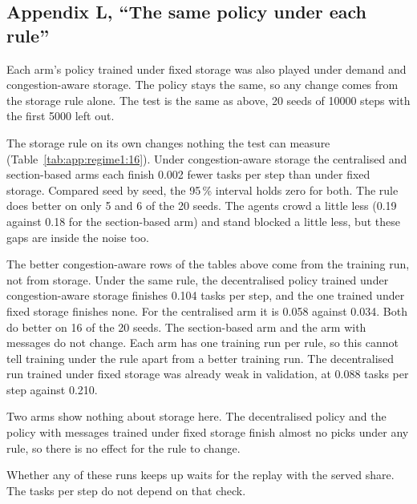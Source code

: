 \documentclass[11pt,a4paper]{article}
\newcommand{\new}[1]{\textcolor{newc}{#1}}
\begin{document}
\subsection*{\new{Appendix L, ``The same policy under each rule''}}

\new{Each arm's policy trained under fixed storage was also played under demand and congestion-aware
storage. The policy stays the same, so any change comes from the storage rule alone. The test is the
same as above, 20 seeds of 10000 steps with the first 5000 left out.}

\new{The storage rule on its own changes nothing the test can measure
(Table~\ref{tab:app:regime1:16}). Under congestion-aware storage the centralised and section-based
arms each finish 0.002 fewer tasks per step than under fixed storage. Compared seed by seed, the
95\,\% interval holds zero for both. The rule does better on only 5 and 6 of the 20 seeds. The agents
crowd a little less (0.19 against 0.18 for the section-based arm) and stand blocked a little less, but
these gaps are inside the noise too.}

\new{The better congestion-aware rows of the tables above come from the training run, not from
storage. Under the same rule, the decentralised policy trained under congestion-aware storage
finishes 0.104 tasks per step, and the one trained under fixed storage finishes none. For the
centralised arm it is 0.058 against 0.034. Both do better on 16 of the 20 seeds. The section-based
arm and the arm with messages do not change. Each arm has one training run per rule, so this cannot
tell training under the rule apart from a better training run. The decentralised run trained under
fixed storage was already weak in validation, at 0.088 tasks per step against 0.210.}

\new{Two arms show nothing about storage here. The decentralised policy and the policy with messages
trained under fixed storage finish almost no picks under any rule, so there is no effect for the rule
to change.}

\new{Whether any of these runs keeps up waits for the replay with the served share. The tasks per step
do not depend on that check.}
\end{document}
